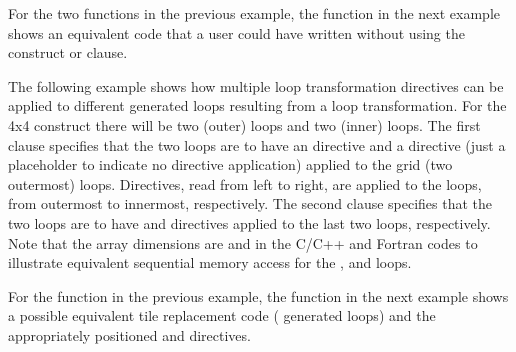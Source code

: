 
For the two functions in the previous example,
the  function in the next example shows an equivalent
code that a user could have written without using the  construct
or  clause.



The following example shows how multiple loop transformation directives
can be applied to different generated loops resulting from a loop transformation.
For the 4x4  construct there will be two (outer)  loops and two (inner)  loops.
The first  clause specifies that the two  loops are to have an  directive and a  directive
(just a placeholder to indicate no directive application) applied to the grid (two outermost) loops.
Directives, read from left to right, are applied to the  loops, from outermost to innermost, respectively.
The second  clause specifies that the two  loops are to have  and  directives applied to the
last two  loops, respectively.
Note that the  array dimensions are  and 
in the C/C++ and Fortran codes to illustrate equivalent sequential memory access for the
,  and  loops.


\pagebreak
{}

For the function in the previous example,
the  function in the next example shows a possible
equivalent tile replacement code ( generated loops) and the
appropriately positioned  and  directives.

\pagebreak
{}



